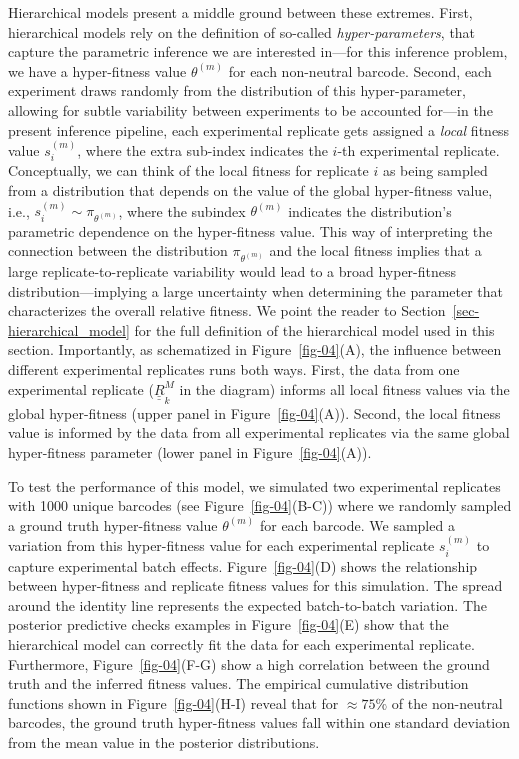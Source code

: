 \documentclass[
  letterpaper,
  DIV=11,
  numbers=noendperiod]{scrartcl}
\begin{document}
\begin{refsegment}
Hierarchical models present a middle ground between these extremes.
First, hierarchical models rely on the definition of so-called
\emph{hyper-parameters}, that capture the parametric inference we are
interested in---for this inference problem, we have a hyper-fitness
value \(\theta^{(m)}\) for each non-neutral barcode. Second, each
experiment draws randomly from the distribution of this hyper-parameter,
allowing for subtle variability between experiments to be accounted
for---in the present inference pipeline, each experimental replicate
gets assigned a \emph{local} fitness value \(s^{(m)}_i\), where the
extra sub-index indicates the \(i\)-th experimental replicate.
Conceptually, we can think of the local fitness for replicate \(i\) as
being sampled from a distribution that depends on the value of the
global hyper-fitness value, i.e., \(s^{(m)}_i \sim \pi_{\theta^{(m)}}\),
where the subindex \(\theta^{(m)}\) indicates the distribution's
parametric dependence on the hyper-fitness value. This way of
interpreting the connection between the distribution
\(\pi_{\theta^{(m)}}\) and the local fitness implies that a large
replicate-to-replicate variability would lead to a broad hyper-fitness
distribution---implying a large uncertainty when determining the
parameter that characterizes the overall relative fitness. We point the
reader to Section~\ref{sec-hierarchical_model} for the full definition
of the hierarchical model used in this section. Importantly, as
schematized in Figure~\ref{fig-04}(A), the influence between different
experimental replicates runs both ways. First, the data from one
experimental replicate (\(\underline{\underline{R}}^M_k\) in the
diagram) informs all local fitness values via the global hyper-fitness
(upper panel in Figure~\ref{fig-04}(A)). Second, the local fitness value
is informed by the data from all experimental replicates via the same
global hyper-fitness parameter (lower panel in Figure~\ref{fig-04}(A)).

To test the performance of this model, we simulated two experimental
replicates with 1000 unique barcodes (see Figure~\ref{fig-04}(B-C))
where we randomly sampled a ground truth hyper-fitness value
\(\theta^{(m)}\) for each barcode. We sampled a variation from this
hyper-fitness value for each experimental replicate \(s^{(m)}_i\) to
capture experimental batch effects. Figure~\ref{fig-04}(D) shows the
relationship between hyper-fitness and replicate fitness values for this
simulation. The spread around the identity line represents the expected
batch-to-batch variation. The posterior predictive checks examples in
Figure~\ref{fig-04}(E) show that the hierarchical model can correctly
fit the data for each experimental replicate. Furthermore,
Figure~\ref{fig-04}(F-G) show a high correlation between the ground
truth and the inferred fitness values. The empirical cumulative
distribution functions shown in Figure~\ref{fig-04}(H-I) reveal that for
\(\approx 75\%\) of the non-neutral barcodes, the ground truth
hyper-fitness values fall within one standard deviation from the mean
value in the posterior distributions.


\end{refsegment}
\end{document}
